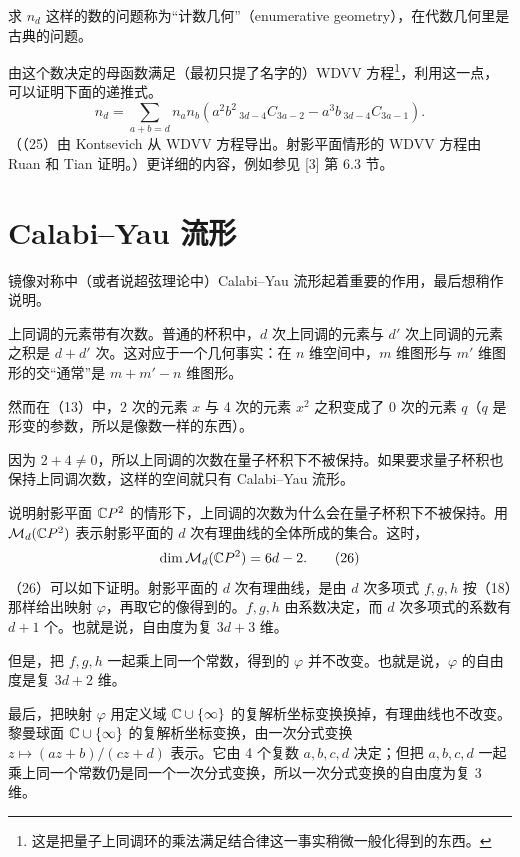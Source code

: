 求 $n_d$ 这样的数的问题称为“计数几何”（enumerative geometry），在代数几何里是古典的问题。

由这个数决定的母函数满足（最初只提了名字的）WDVV 方程\footnote{这是把量子上同调环的乘法满足结合律这一事实稍微一般化得到的东西。}，利用这一点，可以证明下面的递推式。
\begin{equation}
n_d = \sum_{a+b=d} n_a n_b
\left(a^2b^2\,{}_{3d-4}C_{3a-2} - a^3b\,{}_{3d-4}C_{3a-1}\right). \tag{25}
\end{equation}
（（25）由 Kontsevich 从 WDVV 方程导出。射影平面情形的 WDVV 方程由 Ruan 和 Tian 证明。）更详细的内容，例如参见 [3] 第 6.3 节。

\section{Calabi--Yau 流形}

镜像对称中（或者说超弦理论中）Calabi--Yau 流形起着重要的作用，最后想稍作说明。

上同调的元素带有次数。普通的杯积中，$d$ 次上同调的元素与 $d'$ 次上同调的元素之积是 $d+d'$ 次。这对应于一个几何事实：在 $n$ 维空间中，$m$ 维图形与 $m'$ 维图形的交“通常”是 $m+m'-n$ 维图形。

然而在（13）中，2 次的元素 $x$ 与 4 次的元素 $x^2$ 之积变成了 0 次的元素 $q$（$q$ 是形变的参数，所以是像数一样的东西）。

因为 $2+4\ne 0$，所以上同调的次数在量子杯积下不被保持。如果要求量子杯积也保持上同调次数，这样的空间就只有 Calabi--Yau 流形。

说明射影平面 $\mathbb{C}P^2$ 的情形下，上同调的次数为什么会在量子杯积下不被保持。用 $\mathcal{M}_d(\mathbb{C}P^2)$ 表示射影平面的 $d$ 次有理曲线的全体所成的集合。这时，
\begin{equation}
\dim \mathcal{M}_d(\mathbb{C}P^2) = 6d-2. \tag{26}
\end{equation}
（26）可以如下证明。射影平面的 $d$ 次有理曲线，是由 $d$ 次多项式 $f,g,h$ 按（18）那样给出映射 $\varphi$，再取它的像得到的。$f,g,h$ 由系数决定，而 $d$ 次多项式的系数有 $d+1$ 个。也就是说，自由度为复 $3d+3$ 维。

但是，把 $f,g,h$ 一起乘上同一个常数，得到的 $\varphi$ 并不改变。也就是说，$\varphi$ 的自由度是复 $3d+2$ 维。

最后，把映射 $\varphi$ 用定义域 $\mathbb{C}\cup\{\infty\}$ 的复解析坐标变换换掉，有理曲线也不改变。黎曼球面 $\mathbb{C}\cup\{\infty\}$ 的复解析坐标变换，由一次分式变换 $z\mapsto (az+b)/(cz+d)$ 表示。它由 4 个复数 $a,b,c,d$ 决定；但把 $a,b,c,d$ 一起乘上同一个常数仍是同一个一次分式变换，所以一次分式变换的自由度为复 3 维。

